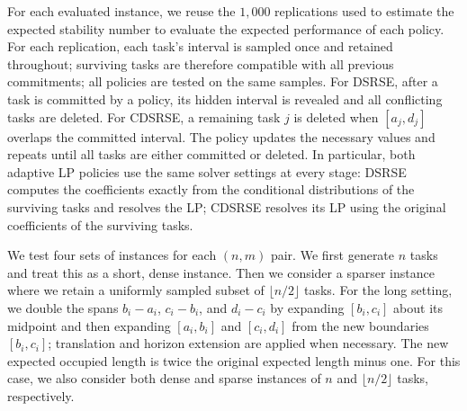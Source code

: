 \documentclass{article}
\begin{document}
{For each evaluated instance, we reuse the $1,000$ replications used to estimate the expected stability number to evaluate the expected performance of each policy.
For each replication, each task's interval is sampled once and retained throughout; surviving tasks are therefore compatible with all previous commitments;
all policies are tested on the same samples.
For DSRSE, after a task is committed by a policy, its hidden interval is revealed and all conflicting tasks are deleted.
For CDSRSE, a remaining task $j$ is deleted when $[a_j,d_j]$ overlaps the committed interval.
The policy updates the necessary values and repeats until all tasks are either committed or deleted.
In particular, both adaptive LP policies use the same solver
settings at every stage: DSRSE computes the coefficients exactly
from the conditional distributions of the surviving tasks and
resolves the LP; CDSRSE resolves its LP using the original
coefficients of the surviving tasks.
}

We test four sets of instances for each $(n,m)$ pair.
We first generate $n$ {tasks }and treat this as a {short}, dense instance.
Then we consider a sparser instance where we {retain a uniformly sampled subset of $\lfloor n/2\rfloor$ tasks.
For the long setting, we double the spans $b_i-a_i$, $c_i-b_i$, and $d_i-c_i$ by expanding }$[b_i,c_i]$ {about its midpoint and then expanding }$[a_i,b_i]$ and $[c_i,d_i]$ from {the new boundaries $[b_i,c_i]$; translation and horizon extension are applied when necessary. %
The new expected occupied length is twice the original expected length minus one.
For }this case, we also consider both dense and sparse instances of $n$ and {$\lfloor n/2\rfloor$ }tasks, respectively.
\end{document}
